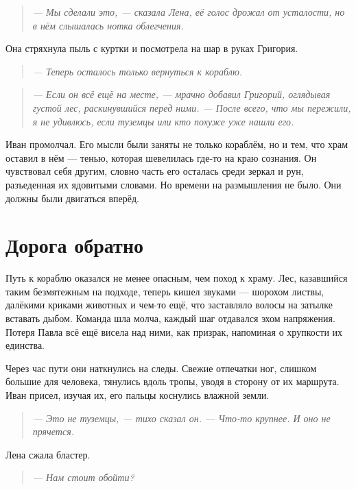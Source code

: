 \documentclass[12pt,a4paper]{book}
\newenvironment{dialogue}{\begin{quote}\itshape}{\end{quote}} %
\begin{document}
\begin{dialogue}
--- Мы сделали это, --- сказала Лена, её голос дрожал от усталости, но в нём слышалась нотка облегчения.
\end{dialogue}

Она стряхнула пыль с куртки и посмотрела на шар в руках Григория.

\begin{dialogue}
--- Теперь осталось только вернуться к кораблю.
\end{dialogue}

\begin{dialogue}
--- Если он всё ещё на месте, --- мрачно добавил Григорий, оглядывая густой лес, раскинувшийся перед ними. --- После всего, что мы пережили, я не удивлюсь, если туземцы или кто похуже уже нашли его.
\end{dialogue}

Иван промолчал. Его мысли были заняты не только кораблём, но и тем, что храм оставил в нём --- тенью, которая шевелилась где-то на краю сознания. Он чувствовал себя другим, словно часть его осталась среди зеркал и рун, разъеденная их ядовитыми словами. Но времени на размышления не было. Они должны были двигаться вперёд.

\section*{Дорога обратно}

Путь к кораблю оказался не менее опасным, чем поход к храму. Лес, казавшийся таким безмятежным на подходе, теперь кишел звуками --- шорохом листвы, далёкими криками животных и чем-то ещё, что заставляло волосы на затылке вставать дыбом. Команда шла молча, каждый шаг отдавался эхом напряжения. Потеря Павла всё ещё висела над ними, как призрак, напоминая о хрупкости их единства.

Через час пути они наткнулись на следы. Свежие отпечатки ног, слишком большие для человека, тянулись вдоль тропы, уводя в сторону от их маршрута. Иван присел, изучая их, его пальцы коснулись влажной земли.

\begin{dialogue}
--- Это не туземцы, --- тихо сказал он. --- Что-то крупнее. И оно не прячется.
\end{dialogue}

Лена сжала бластер.

\begin{dialogue}
--- Нам стоит обойти?
\end{dialogue}
\end{document}
